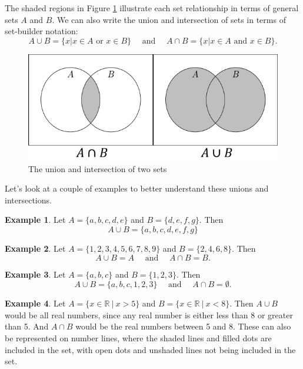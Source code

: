 \documentclass[
]{book}
\theoremstyle{definition}
\theoremstyle{definition}
\newtheorem{example}{Example}[chapter]
\theoremstyle{definition}
\theoremstyle{remark}
\begin{document}
The shaded regions in Figure \ref{fig:set-union} illustrate each set relationship in terms of general sets \(A\) and \(B\). We can also write the union and intersection of sets in terms of set-builder notation:
\[A\cup B = \{x \vert x\in A \mbox{ or } x\in B\} \quad \mbox{ and } \quad A\cap B =\{x\vert x\in A \mbox{ and } x\in B\}.\]

\begin{figure}

{\centering \includegraphics[width=0.7\linewidth]{tikz/Set_unions_intersections} 

}

\caption{The union and intersection of two sets}\label{fig:set-union}
\end{figure}

Let's look at a couple of examples to better understand these unions and intersections.

\begin{example}
\protect\hypertarget{exm:unnamed-chunk-13}{}{\label{exm:unnamed-chunk-13} } Let \(A = \{a, b, c, d, e\}\) and \(B = \{ d, e, f, g\}\). Then \[A\cup B=\{a, b, c, d, e, f, g\} \]
\end{example}

\begin{example}
\protect\hypertarget{exm:unnamed-chunk-14}{}{\label{exm:unnamed-chunk-14} } Let \(A=\{1,2,3,4,5,6,7,8,9\}\) and \(B=\{2,4,6,8\}\). Then
\[A \cup B = A \quad \mbox{ and } \quad A\cap B = B.\]
\end{example}

\begin{example}
\protect\hypertarget{exm:unnamed-chunk-15}{}{\label{exm:unnamed-chunk-15} } Let \(A=\{a,b,c\}\) and \(B=\{1,2,3\}\). Then
\[A\cup B = \{a,b,c,1,2,3\} \quad \mbox{ and } \quad A\cap B =\emptyset.\]
\end{example}

\begin{example}
\protect\hypertarget{exm:unnamed-chunk-16}{}{\label{exm:unnamed-chunk-16} } Let \(A = \{ x\in \mathbb{R} \: \vert \: x > 5\}\) and \(B=\{x \in \mathbb{R} \: \vert \: x < 8\}\). Then \(A\cup B\) would be all real numbers, since any real number is either less than 8 or greater than 5. And \(A\cap B\) would be the real numbers between 5 and 8. These can also be represented on number lines, where the shaded lines and filled dots are included in the set, with open dots and unshaded lines not being included in the set.
\end{example}
\end{document}
